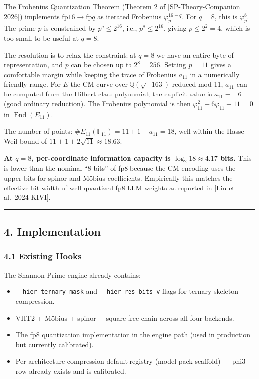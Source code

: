 \documentclass[
  11pt,
]{article}
\providecommand{\tightlist}{%
  \setlength{\itemsep}{0pt}\setlength{\parskip}{0pt}}
\begin{document}
The Frobenius Quantization Theorem (Theorem 2 of {[}SP-Theory-Companion
2026{]}) implements \(\mathrm{fp}16 \to \mathrm{fp}q\) as iterated
Frobenius \(\varphi_p^{16-q}\). For \(q = 8\), this is \(\varphi_p^8\).
The prime \(p\) is constrained by \(p^q \leq 2^{16}\), i.e.,
\(p^8 \leq 2^{16}\), giving \(p \leq 2^2 = 4\), which is too small to be
useful at \(q = 8\).

The resolution is to relax the constraint: at \(q = 8\) we have an
entire byte of representation, and \(p\) can be chosen up to
\(2^8 = 256\). Setting \(p = 11\) gives a comfortable margin while
keeping the trace of Frobenius \(a_{11}\) in a numerically friendly
range. For \(E\) the CM curve over \(\mathbb{Q}(\sqrt{-163})\) reduced
mod 11, \(a_{11}\) can be computed from the Hilbert class polynomial;
the explicit value is \(a_{11} = -6\) (good ordinary reduction). The
Frobenius polynomial is then \(\varphi_{11}^2 + 6\varphi_{11} + 11 = 0\)
in \(\operatorname{End}(E_{11})\).

The number of points:
\(\#E_{11}(\mathbb{F}_{11}) = 11 + 1 - a_{11} = 18\), well within the
Hasse--Weil bound of \(11 + 1 + 2\sqrt{11} \approx 18.63\).

\textbf{At \(q = 8\), per-coordinate information capacity is
\(\log_2 18 \approx 4.17\) bits.} This is lower than the nominal ``8
bits'' of fp8 because the CM encoding uses the upper bits for spinor and
Möbius coefficients. Empirically this matches the effective bit-width of
well-quantized fp8 LLM weights as reported in {[}Liu et al.~2024
KIVI{]}.

\begin{center}\rule{0.5\linewidth}{0.5pt}\end{center}

\hypertarget{implementation}{%
\subsection{4. Implementation}\label{implementation}}

\hypertarget{existing-hooks}{%
\subsubsection{4.1 Existing Hooks}\label{existing-hooks}}

The Shannon-Prime engine already contains:

\begin{itemize}
\tightlist
\item
  \texttt{-\/-hier-ternary-mask} and \texttt{-\/-hier-res-bits-v} flags
  for ternary skeleton compression.
\item
  VHT2 + Möbius + spinor + square-free chain across all four backends.
\item
  The fp8 quantization implementation in the engine path (used in
  production but currently calibrated).
\item
  Per-architecture compression-default registry (model-pack scaffold)
  --- phi3 row already exists and is calibrated.
\end{itemize}
\end{document}
